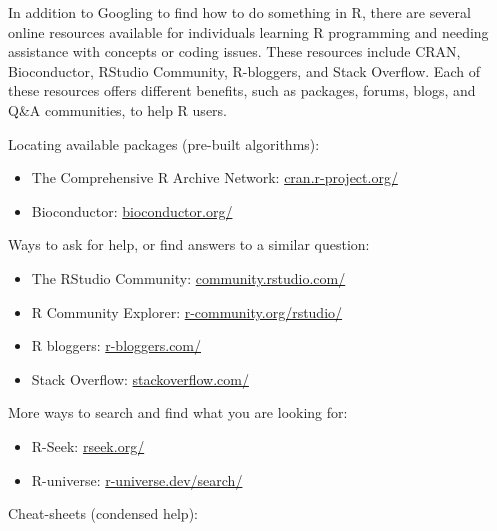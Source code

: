 \documentclass[
]{book}
\begin{document}
In addition to Googling to find how to do something in R, there are several online resources available for individuals learning R programming and needing assistance with concepts or coding issues. These resources include CRAN, Bioconductor, RStudio Community, R-bloggers, and Stack Overflow. Each of these resources offers different benefits, such as packages, forums, blogs, and Q\&A communities, to help R users.

Locating available packages (pre-built algorithms):

\begin{itemize}
\item
  The Comprehensive R Archive Network: \href{https://cran.r-project.org/}{cran.r-project.org/}
\item
  Bioconductor: \href{https://bioconductor.org/}{bioconductor.org/}
\end{itemize}

Ways to ask for help, or find answers to a similar question:

\begin{itemize}
\item
  The RStudio Community: \href{https://community.rstudio.com/}{community.rstudio.com/}
\item
  R Community Explorer: \href{https://r-community.org/rstudio/}{r-community.org/rstudio/}
\item
  R bloggers: \href{https://www.r-bloggers.com/}{r-bloggers.com/}
\item
  Stack Overflow: \href{https://stackoverflow.com/questions/tagged/r}{stackoverflow.com/}
\end{itemize}

More ways to search and find what you are looking for:

\begin{itemize}
\item
  R-Seek: \href{https://rseek.org/}{rseek.org/}
\item
  R-universe: \href{https://r-universe.dev/search/}{r-universe.dev/search/}
\end{itemize}

Cheat-sheets (condensed help):
\end{document}
